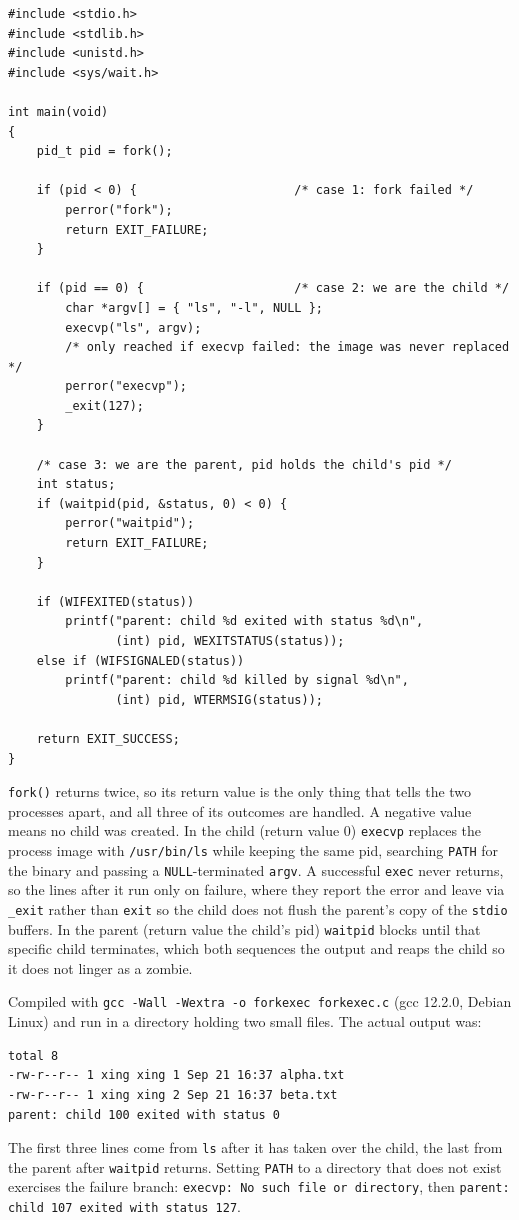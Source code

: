 \begin{lstlisting}[style=p2cstyle]
#include <stdio.h>
#include <stdlib.h>
#include <unistd.h>
#include <sys/wait.h>

int main(void)
{
    pid_t pid = fork();

    if (pid < 0) {                      /* case 1: fork failed */
        perror("fork");
        return EXIT_FAILURE;
    }

    if (pid == 0) {                     /* case 2: we are the child */
        char *argv[] = { "ls", "-l", NULL };
        execvp("ls", argv);
        /* only reached if execvp failed: the image was never replaced */
        perror("execvp");
        _exit(127);
    }

    /* case 3: we are the parent, pid holds the child's pid */
    int status;
    if (waitpid(pid, &status, 0) < 0) {
        perror("waitpid");
        return EXIT_FAILURE;
    }

    if (WIFEXITED(status))
        printf("parent: child %d exited with status %d\n",
               (int) pid, WEXITSTATUS(status));
    else if (WIFSIGNALED(status))
        printf("parent: child %d killed by signal %d\n",
               (int) pid, WTERMSIG(status));

    return EXIT_SUCCESS;
}
\end{lstlisting}

\texttt{fork()} returns twice, so its return value is the only thing that tells the
two processes apart, and all three of its outcomes are handled. A negative value
means no child was created. In the child (return value $0$) \texttt{execvp} replaces
the process image with \texttt{/usr/bin/ls} while keeping the same pid, searching
\texttt{PATH} for the binary and passing a \texttt{NULL}-terminated \texttt{argv}. A
successful \texttt{exec} never returns, so the lines after it run only on failure,
where they report the error and leave via \texttt{\_exit} rather than \texttt{exit}
so the child does not flush the parent's copy of the \texttt{stdio} buffers. In the
parent (return value the child's pid) \texttt{waitpid} blocks until that specific
child terminates, which both sequences the output and reaps the child so it does not
linger as a zombie.

Compiled with \texttt{gcc -Wall -Wextra -o forkexec forkexec.c} (gcc 12.2.0, Debian
Linux) and run in a directory holding two small files. The actual output was:

\begin{lstlisting}[basicstyle=\ttfamily\small,frame=single,framesep=4pt,columns=fullflexible]
total 8
-rw-r--r-- 1 xing xing 1 Sep 21 16:37 alpha.txt
-rw-r--r-- 1 xing xing 2 Sep 21 16:37 beta.txt
parent: child 100 exited with status 0
\end{lstlisting}

The first three lines come from \texttt{ls} after it has taken over the child, the
last from the parent after \texttt{waitpid} returns. Setting \texttt{PATH} to a
directory that does not exist exercises the failure branch: \texttt{execvp: No such
file or directory}, then \texttt{parent: child 107 exited with status 127}.
